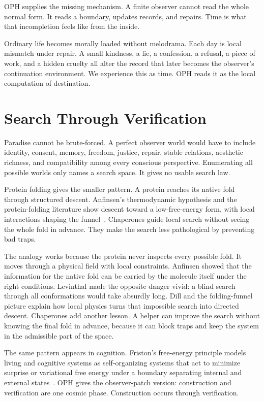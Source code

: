 \documentclass[11pt]{article}
\theoremstyle{remark}
\theoremstyle{plain}
\begin{document}
OPH supplies the missing mechanism. A finite observer cannot read the whole
normal form. It reads a boundary, updates records, and repairs. Time is what
that incompletion feels like from the inside.

Ordinary life becomes morally loaded without melodrama. Each
day is local mismatch under repair. A small kindness, a lie, a confession, a
refusal, a piece of work, and a hidden cruelty all alter the record that later
becomes the observer's continuation environment. We experience this as time.
OPH reads it as the local computation of destination.

\section{Search Through Verification}

Paradise cannot be brute-forced. A perfect observer world would have to include
identity, consent, memory, freedom, justice, repair, stable relations, aesthetic
richness, and compatibility among every conscious perspective. Enumerating all
possible worlds only names a search space. It gives no usable search law.

Protein folding gives the smaller pattern. A protein reaches its native fold
through structured descent. Anfinsen's thermodynamic hypothesis and the
protein-folding literature show descent toward a low-free-energy form, with
local interactions shaping the funnel~\cite{Anfinsen1973,Levinthal1969,Dill1997}.
Chaperones guide local search without seeing the whole fold in advance. They
make the search less pathological by preventing bad traps.

The analogy works because the protein never inspects every possible fold.
It moves through a physical field with local constraints. Anfinsen showed that
the information for the native fold can be carried by the molecule itself under
the right conditions. Levinthal made the opposite danger vivid: a blind search
through all conformations would take absurdly long. Dill and the folding-funnel
picture explain how local physics turns that impossible search into directed
descent. Chaperones add another lesson. A helper can improve the search without
knowing the final fold in advance, because it can block traps and keep the
system in the admissible part of the space.

The same pattern appears in cognition. Friston's free-energy principle models
living and cognitive systems as self-organizing systems that act to minimize
surprise or variational free energy under a boundary separating internal and
external states~\cite{Friston2010,Friston2019}. OPH gives the observer-patch
version: construction and verification are one cosmic phase. Construction
occurs through verification.
\end{document}
